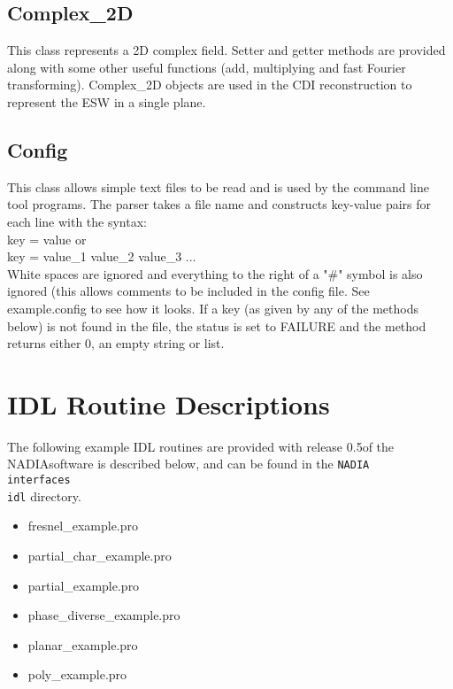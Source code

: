 \documentclass[]{nadia}
\def\ver{0.5}
\def\name{NADIA}
\begin{document}
\subsection{Complex\_2D}
This class represents a 2D complex field. Setter and getter methods
are provided along with some other useful functions (add, multiplying
and fast Fourier transforming). Complex\_2D objects are used in the CDI
reconstruction to represent the ESW in a single plane.

\subsection{Config}
This class allows simple text files to be read and is used by the
command line tool programs. The parser takes a file name and
constructs key-value pairs for each line with the syntax:\\ 
key = value or \\
key = value\_1 value\_2 value\_3 ... \\
White spaces are ignored and everything to the right of a "\#" symbol
is also ignored (this allows comments to be included in the config
file. See example.config to see how it looks. If a key (as given by
any of the methods below) is not found in the file, the status is set
to FAILURE and the method returns either 0, an empty string or list.


\section{IDL Routine Descriptions}
\label{sec:idl_routines}
The following example IDL routines are provided with release \ver of the
\name software is described below, and can be found in the {\tt \name\\interfaces\\idl} directory. 

\begin{itemize}
\item fresnel\_example.pro
\item partial\_char\_example.pro
\item partial\_example.pro
\item phase\_diverse\_example.pro
\item planar\_example.pro
\item poly\_example.pro
\end{itemize}
\end{document}
